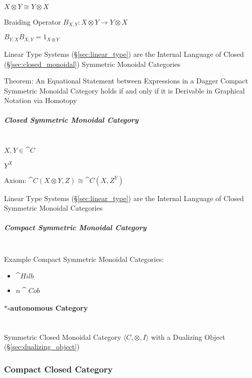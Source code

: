 $X \otimes Y \cong Y \otimes X$

Braiding Operator $B_{X,Y} : X \otimes Y \rightarrow Y \otimes X$

$B_{Y,X} B_{X,Y} = 1_{X \otimes Y}$

Linear Type Systems (\S\ref{sec:linear_type}) are the Internal
Language of Closed (\S\ref{sec:closed_monoidal}) Symmetric Monoidal
Categories

Theorem: An Equational Statement between Expressions in a Dagger
Compact Symmetric Monoidal Category holds if and only if it is
Derivable in Graphical Notation via Homotopy %



\subparagraph{Closed Symmetric Monoidal Category}
\label{sec:closed_symmetric_monoidal}
\hfill \\

$X, Y \in \cat{C}$

$Y^X$

Axiom: $\cat{C}(X \otimes Y, Z) \cong \cat{C}(X, Z^Y)$

Linear Type Systems (\S\ref{sec:linear_type}) are the Internal
Language of Closed Symmetric Monoidal Categories



\subparagraph{Compact Symmetric Monoidal Category}
\label{sec:compact_symmetric_monoidal}
\hfill \\

Example Compact Symmetric Monoidal Categories:

\begin{itemize}
\item $\cat{Hilb}$
\item $n\cat{Cob}$
\end{itemize}



\paragraph{$*$-autonomous Category}\label{sec:star_autonomous}
\hfill \\

Symmetric Closed Monoidal Category $\langle C, \otimes, I \rangle$
with a Dualizing Object (\S\ref{sec:dualizing_object})



\subsubsection{Compact Closed Category}\label{sec:compact_closed}

